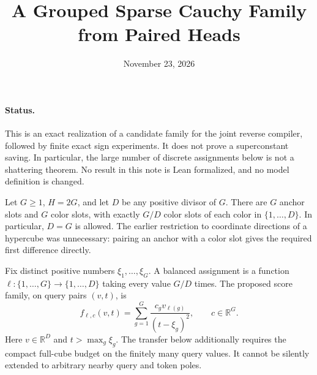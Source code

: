 \documentclass[11pt]{article}
\title{A Grouped Sparse Cauchy Family from Paired Heads}
\author{}
\date{November 23, 2026}
\begin{document}
\maketitle

\paragraph{Status.}
This is an exact realization of a candidate family for the joint reverse
compiler, followed by finite exact sign experiments. It does not prove a
superconstant saving. In particular, the large number of discrete
assignments below is not a shattering theorem. No result in this note is
Lean formalized, and no model definition is changed.

Let $G\geq1$, $H=2G$, and let $D$ be any positive divisor of $G$.
There are $G$ anchor slots and $G$ color slots, with exactly $G/D$
color slots of each color in $\{1,\ldots,D\}$. In particular, $D=G$
is allowed. The earlier restriction to coordinate directions of a
hypercube was unnecessary: pairing an anchor with a color slot gives
the required first difference directly.

Fix distinct positive numbers $\xi_1,\ldots,\xi_G$. A balanced assignment
is a function $\ell:\{1,\ldots,G\}\to\{1,\ldots,D\}$ taking every value
$G/D$ times. The proposed score family, on query pairs $(v,t)$, is
\[
 f_{\ell,c}(v,t)=\sum_{g=1}^G
       \frac{c_gv_{\ell(g)}}{(t-\xi_g)^2},
 \qquad c\in\mathbb R^G.                         \tag{1}
\]
Here $v\in\mathbb R^D$ and $t>\max_g\xi_g$. The transfer below additionally
requires the compact full-cube budget on the finitely many query values.
It cannot be silently extended to arbitrary nearby query and token poles.
\end{document}
